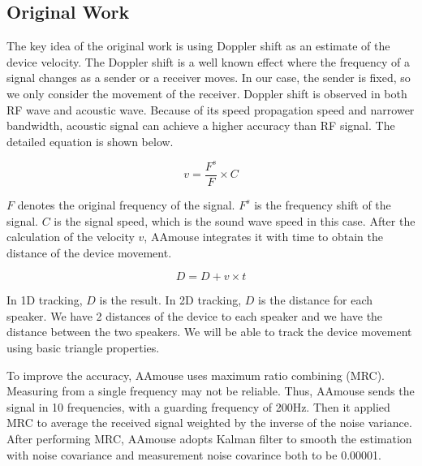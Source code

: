 \documentclass{acm_proc_article-sp}
\begin{document}
\subsection{Original Work}
The key idea of the original work is using Doppler shift as an
estimate of the device velocity. The Doppler shift is a well known
effect where the frequency of a signal changes as a sender or a 
receiver moves. In our case, the sender is fixed, so we only 
consider the movement of the receiver. Doppler shift is observed
in both RF wave and acoustic wave. Because of its speed propagation
speed and narrower bandwidth, 
acoustic signal can achieve a higher accuracy than RF signal.
The detailed equation is shown below.

\begin{equation}
v= \frac {F^s}{F} \times C
\end{equation}

\begin{math} F \end{math} denotes the original frequency of the
signal. \begin{math} F^s \end{math} is the frequency shift of the
signal. \begin{math} C \end{math} is the signal speed, which is the
sound wave speed in this case. After the calculation of the velocity
\begin{math} v \end{math}, AAmouse integrates it 
with time to obtain the distance of the device movement.

\begin{equation}
D = D + v \times t
\end{equation}

In 1D tracking, \begin{math} D \end{math} is the result. In 2D
tracking, \begin{math} D \end{math} is the distance for each
speaker. We have 2 distances of the device to each speaker and
we have the distance between the two speakers. We will be able to
track the device movement using basic triangle properties. 

To improve the accuracy, AAmouse uses maximum ratio combining (MRC). 
Measuring from a single frequency may not be reliable. Thus, AAmouse
sends the signal in 10 frequencies, with a guarding frequency of 
200Hz. Then it applied MRC to average the received signal weighted
by the inverse of the noise variance. After performing MRC,
AAmouse adopts Kalman filter to smooth the estimation with noise
covariance and measurement noise covarince both to be 0.00001.
\end{document}
